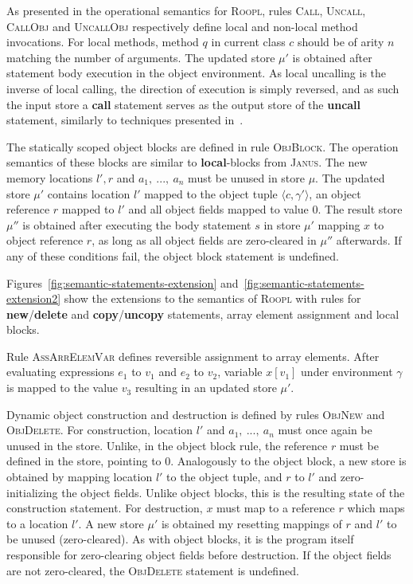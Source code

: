 As presented in the operational semantics for \textsc{Roopl}, rules \textsc{Call}, \textsc{Uncall}, \textsc{CallObj} and \textsc{UncallObj} respectively define local and non-local method invocations. For local methods, method $q$ in current class $c$ should be of arity $n$ matching the number of arguments. The updated store $\mu'$ is obtained after statement body execution in the object environment. As local uncalling is the inverse of local calling, the direction of execution is simply reversed, and as such the input store a \textbf{call} statement serves as the output store of the \textbf{uncall} statement, similarly to techniques presented in~\cite{ty:janus, ty:ejanus}.

The statically scoped object blocks are defined in rule \textsc{ObjBlock}. The operation semantics of these blocks are similar to \textbf{local}-blocks from \textsc{Janus}. The new memory locations $l', r$ and $a_1,\ ...,\ a_n$ must be unused in store $\mu$. The updated store $\mu'$ contains location $l'$ mapped to the object tuple $\langle c, \gamma' \rangle$, an object reference $r$ mapped to $l'$ and all object fields mapped to value $0$. The result store $\mu''$ is obtained after executing the body statement $s$ in store $\mu'$ mapping $x$ to object reference $r$, as long as all object fields are zero-cleared in $\mu''$ afterwards. If any of these conditions fail, the object block statement is undefined.

Figures~\ref{fig:semantic-statements-extension} and~\ref{fig:semantic-statements-extension2} show the extensions to the semantics of \textsc{Roopl} with rules for \textbf{new}/\textbf{delete} and \textbf{copy}/\textbf{uncopy} statements, array element assignment and local blocks.

Rule \textsc{AssArrElemVar} defines reversible assignment to array elements. After evaluating expressions $e_1$ to $v_1$ and $e_2$ to $v_2$, variable $x[v_1]$ under environment $\gamma$ is mapped to the value $v_3$ resulting in an updated store $\mu'$.

Dynamic object construction and destruction is defined by rules \textsc{ObjNew} and \textsc{ObjDelete}. For construction, location $l'$ and $a_1,\ ...,\ a_n$ must once again be unused in the store. Unlike, in the object block rule, the reference $r$ must be defined in the store, pointing to $0$. Analogously to the object block, a new store is obtained by mapping location $l'$ to the object tuple, and $r$ to $l'$ and zero-initializing the object fields. Unlike object blocks, this is the resulting state of the construction statement. For destruction, $x$ must map to a reference $r$ which maps to a location $l'$. A new store $\mu'$ is obtained my resetting mappings of $r$ and $l'$ to be unused (zero-cleared). As with object blocks, it is the program itself responsible for zero-clearing object fields before destruction. If the object fields are not zero-cleared, the \textsc{ObjDelete} statement is undefined.

